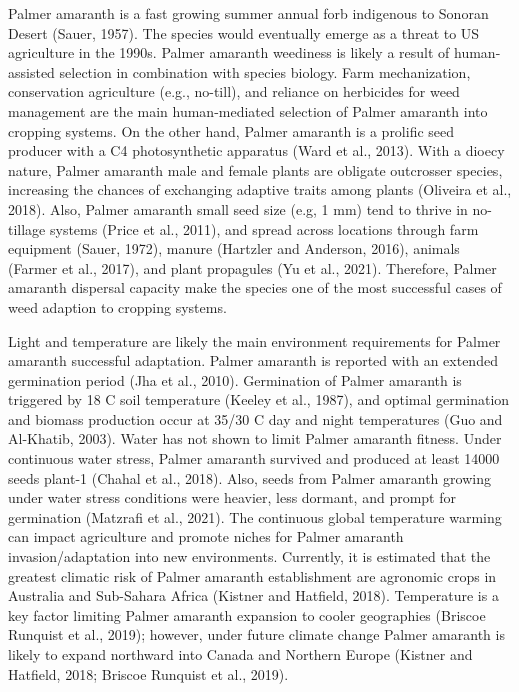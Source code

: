 \documentclass[utf8]{frontiersSCNS}
\begin{document}
Palmer amaranth is a fast growing summer annual forb indigenous to
Sonoran Desert (Sauer, 1957). The species would eventually emerge as a
threat to US agriculture in the 1990s. Palmer amaranth weediness is
likely a result of human-assisted selection in combination with species
biology. Farm mechanization, conservation agriculture (e.g., no-till),
and reliance on herbicides for weed management are the main
human-mediated selection of Palmer amaranth into cropping systems. On
the other hand, Palmer amaranth is a prolific seed producer with a C4
photosynthetic apparatus (Ward et al., 2013). With a dioecy nature,
Palmer amaranth male and female plants are obligate outcrosser species,
increasing the chances of exchanging adaptive traits among plants
(Oliveira et al., 2018). Also, Palmer amaranth small seed size (e.g, 1
mm) tend to thrive in no-tillage systems (Price et al., 2011), and
spread across locations through farm equipment (Sauer, 1972), manure
(Hartzler and Anderson, 2016), animals (Farmer et al., 2017), and plant
propagules (Yu et al., 2021). Therefore, Palmer amaranth dispersal
capacity make the species one of the most successful cases of weed
adaption to cropping systems.

Light and temperature are likely the main environment requirements for
Palmer amaranth successful adaptation. Palmer amaranth is reported with
an extended germination period (Jha et al., 2010). Germination of Palmer
amaranth is triggered by 18 C soil temperature (Keeley et al., 1987),
and optimal germination and biomass production occur at 35/30 C day and
night temperatures (Guo and Al-Khatib, 2003). Water has not shown to
limit Palmer amaranth fitness. Under continuous water stress, Palmer
amaranth survived and produced at least 14000 seeds plant-1 (Chahal et
al., 2018). Also, seeds from Palmer amaranth growing under water stress
conditions were heavier, less dormant, and prompt for germination
(Matzrafi et al., 2021). The continuous global temperature warming can
impact agriculture and promote niches for Palmer amaranth
invasion/adaptation into new environments. Currently, it is estimated
that the greatest climatic risk of Palmer amaranth establishment are
agronomic crops in Australia and Sub-Sahara Africa (Kistner and
Hatfield, 2018). Temperature is a key factor limiting Palmer amaranth
expansion to cooler geographies (Briscoe Runquist et al., 2019);
however, under future climate change Palmer amaranth is likely to expand
northward into Canada and Northern Europe (Kistner and Hatfield, 2018;
Briscoe Runquist et al., 2019).
\end{document}
